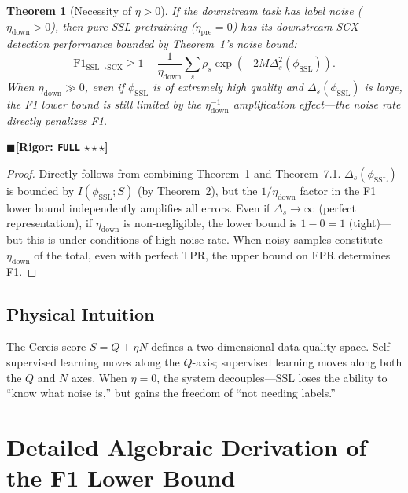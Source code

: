 \documentclass[12pt,a4paper]{article}
\newtheorem{theorem}{Theorem}[section]
\theoremstyle{definition}
\theoremstyle{remark}
\newcommand{\rigorFull}{$\blacksquare$\;\textbf{[Rigor: \texttt{FULL} $\star\star\star$]}}
\begin{document}
\begin{theorem}[Necessity of $\eta > 0$]
\label{thm:7.2}
If the downstream task has label noise ($\eta_{\text{down}} > 0$), then pure SSL pretraining ($\eta_{\text{pre}} = 0$) has its downstream SCX detection performance bounded by Theorem~1's noise bound:
\begin{equation}
\mathrm{F1}_{\text{SSL}\to\text{SCX}} \geq 1 - \frac{1}{\eta_{\text{down}}}\sum_s \rho_s \exp(-2M\Delta_s^2(\phi_{\text{SSL}})).
\end{equation}
When $\eta_{\text{down}} \gg 0$, even if $\phi_{\text{SSL}}$ is of extremely high quality and $\Delta_s(\phi_{\text{SSL}})$ is large, the F1 lower bound is still limited by the $\eta_{\text{down}}^{-1}$ amplification effect---the noise rate directly penalizes F1.
\end{theorem}
\rigorFull

\begin{proof}
Directly follows from combining Theorem~1 and Theorem~7.1. $\Delta_s(\phi_{\text{SSL}})$ is bounded by $I(\phi_{\text{SSL}}; S)$ (by Theorem~2), but the $1/\eta_{\text{down}}$ factor in the F1 lower bound independently amplifies all errors. Even if $\Delta_s \to \infty$ (perfect representation), if $\eta_{\text{down}}$ is non-negligible, the lower bound is $1-0=1$ (tight)---but this is under conditions of high noise rate. When noisy samples constitute $\eta_{\text{down}}$ of the total, even with perfect TPR, the upper bound on FPR determines F1.
\end{proof}

\subsection{Physical Intuition}
The Cercis score $S = Q + \eta N$ defines a two-dimensional data quality space. Self-supervised learning moves along the $Q$-axis; supervised learning moves along both the $Q$ and $N$ axes. When $\eta = 0$, the system decouples---SSL loses the ability to ``know what noise is,'' but gains the freedom of ``not needing labels.''

\section{Detailed Algebraic Derivation of the F1 Lower Bound}
\label{sec:f1-derivation-detail}
\end{document}
